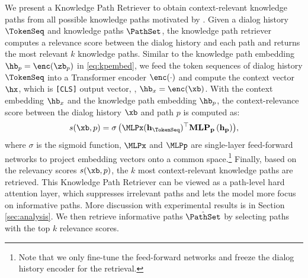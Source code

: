 
We present a Knowledge Path Retriever to obtain context-relevant knowledge paths from all possible knowledge paths motivated by \cite{lewis2020retrieval,kang2022knowledge}.
Given a dialog history $\TokenSeq$ and knowledge paths $\PathSet$, the knowledge path retriever computes a relevance score between the dialog history and each path and returns the most relevant $k$ knowledge paths.
Similar to the knowledge path embedding $\hb_p = \enc(\zb_p)$ in \eqref{eq:kpembed}, 
we feed the token sequences of dialog history $\TokenSeq$ into a Transformer encoder $\enc(\cdot)$ and compute the context vector $\hx$, which is \texttt{[CLS]} output vector, \ie, $\hb_x = \enc(\xb)$.
With the context embedding $\hb_x$ and the knowledge path embedding $\hb_p$, 
the context-relevance score between the dialog history $\xb$ and path $p$ is computed as:
\begin{equation}
s ( \xb, p ) = \mathbf{\sigma\left( \MLPx (h_{\TokenSeq})^\top MLP_p\left(h_p \right)\right)},
\label{eq:kpscore}
\end{equation}
where $\sigma$ is the sigmoid function, $\MLPx$ and $\MLPp$ are single-layer feed-forward networks to project embedding vectors onto a common space.\footnote{Note that we only fine-tune the feed-forward networks and freeze the dialog history encoder for the retrieval.}
Finally, based on the relevancy scores $s (\xb, p)$, the $k$ most context-relevant knowledge paths are retrieved. 
This Knowledge Path Retriever can be viewed as a path-level hard attention layer, which suppresses irrelevant paths and lets the model more focus on informative paths. More discussion with experimental results is in Section \ref{sec:analysis}.
We then retrieve informative paths $\hat{\PathSet}$ by selecting paths with the top $k$ relevance scores.